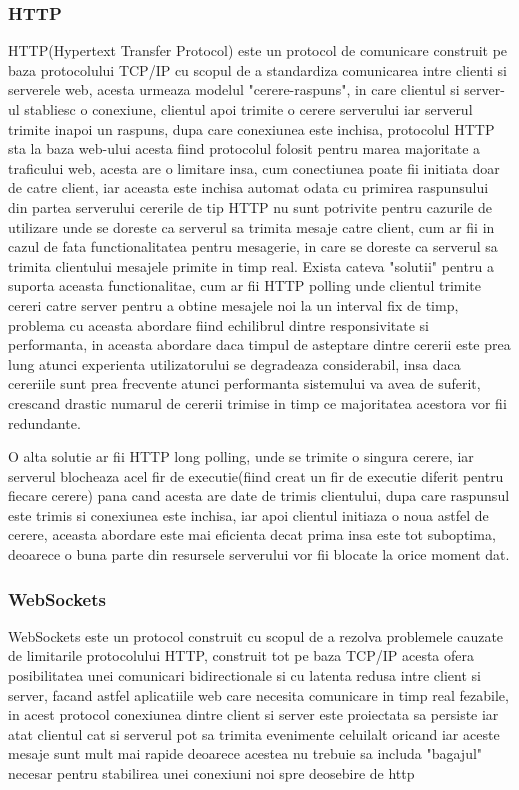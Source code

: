 \documentclass[12pt,a4paper,hidelinks]{report}
\theoremstyle{definition}
\theoremstyle{remark}
\begin{document}
\subsubsection{HTTP}
HTTP(Hypertext Transfer Protocol) este un protocol de comunicare construit pe baza  protocolului TCP/IP cu scopul de a standardiza
comunicarea intre clienti si serverele web, acesta urmeaza modelul "cerere-raspuns", in care
clientul si server-ul stabliesc o conexiune, clientul apoi trimite o cerere serverului iar serverul trimite inapoi un raspuns,
dupa care conexiunea este inchisa, protocolul HTTP sta la baza web-ului acesta fiind protocolul folosit pentru marea majoritate
a traficului web, acesta are o limitare insa, cum conectiunea poate fii initiata doar de catre client, iar aceasta este inchisa automat odata cu
primirea raspunsului din partea serverului cererile de tip HTTP nu sunt potrivite pentru cazurile de utilizare unde se doreste ca serverul sa 
trimita mesaje catre client, cum ar fii in cazul de fata functionalitatea pentru mesagerie, in care se doreste ca serverul 
sa trimita clientului mesajele primite in timp real. Exista cateva "solutii" pentru a suporta aceasta functionalitae, cum ar fii HTTP polling
unde clientul trimite cereri catre server pentru a obtine mesajele noi la un interval fix de timp, problema cu aceasta abordare fiind
echilibrul dintre responsivitate si performanta, in aceasta abordare daca timpul de asteptare dintre cererii este prea lung atunci experienta utilizatorului
se degradeaza considerabil, insa daca cereriile sunt prea frecvente atunci performanta sistemului va avea de suferit, crescand drastic numarul de cererii
trimise in timp ce majoritatea acestora vor fii redundante.

O alta solutie ar fii HTTP long polling, unde se trimite o singura cerere, iar serverul blocheaza acel fir de executie(fiind creat un fir de executie diferit pentru fiecare cerere) pana cand
acesta are date de trimis clientului, dupa care raspunsul este trimis si conexiunea este inchisa, iar apoi clientul initiaza o noua astfel de cerere,
aceasta abordare este mai eficienta decat prima insa este tot suboptima, deoarece o buna parte din resursele serverului vor fii blocate la orice moment dat.
\subsubsection{WebSockets}
WebSockets este un protocol construit cu scopul de a rezolva problemele cauzate de limitarile protocolului HTTP, construit tot pe baza TCP/IP acesta ofera 
posibilitatea unei comunicari bidirectionale si cu latenta redusa intre client si server, facand astfel aplicatiile web care necesita comunicare in timp real
fezabile, in acest protocol conexiunea dintre client si server este proiectata sa persiste iar atat clientul cat si serverul pot sa trimita evenimente
celuilalt oricand iar aceste mesaje sunt mult mai rapide deoarece acestea nu trebuie sa includa "bagajul" necesar pentru stabilirea unei conexiuni noi 
spre deosebire de http
\end{document}
